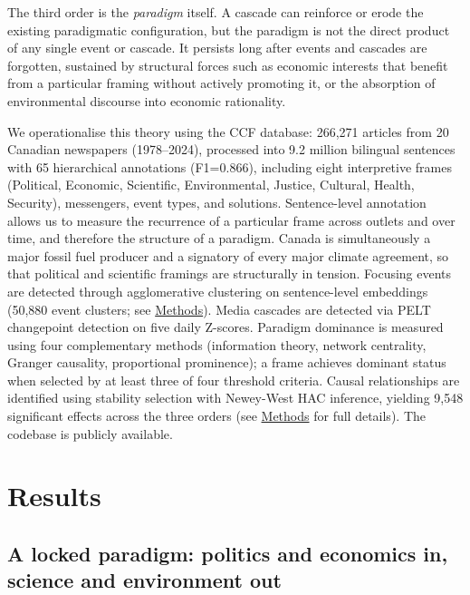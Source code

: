 \documentclass[11pt]{article}
\begin{document}
The third order is the \textit{paradigm} itself. A cascade can reinforce or erode the existing paradigmatic configuration, but the paradigm is not the direct product of any single event or cascade. It persists long after events and cascades are forgotten, sustained by structural forces such as economic interests that benefit from a particular framing without actively promoting it\cite{culpepperQuietPoliticsBusiness2011}, or the absorption of environmental discourse into economic rationality\cite{hajerPoliticsEnvironmentalDiscourse1995}.

We operationalise this theory using the CCF database\cite{lemorCCFDatabase2026}: 266,271 articles from 20 Canadian newspapers (1978--2024), processed into 9.2 million bilingual sentences with 65 hierarchical annotations (F1=0.866), including eight interpretive frames (Political, Economic, Scientific, Environmental, Justice, Cultural, Health, Security), messengers, event types, and solutions. Sentence-level annotation allows us to measure the recurrence of a particular frame across outlets and over time, and therefore the structure of a paradigm. Canada is simultaneously a major fossil fuel producer and a signatory of every major climate agreement, so that political and scientific framings are structurally in tension. Focusing events are detected through agglomerative clustering on sentence-level embeddings (50,880 event clusters; see \hyperref[sec:methods]{Methods}). Media cascades are detected via PELT changepoint detection on five daily Z-scores. Paradigm dominance is measured using four complementary methods (information theory, network centrality, Granger causality, proportional prominence); a frame achieves dominant status when selected by at least three of four threshold criteria. Causal relationships are identified using stability selection\cite{meinshausenStabilitySelection2010} with Newey-West HAC inference, yielding 9,548 significant effects across the three orders (see \hyperref[sec:methods]{Methods} for full details). The codebase is publicly available.


\section*{Results}

\subsection*{A locked paradigm: politics and economics in, science and environment out}
\end{document}
